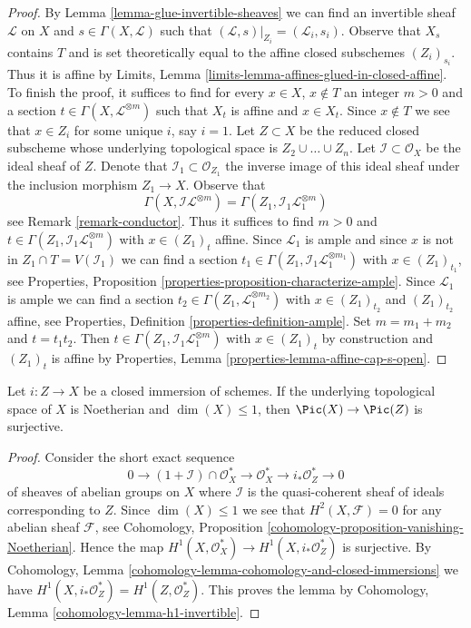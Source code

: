 \begin{proof}
\medskip\noindent
By Lemma \ref{lemma-glue-invertible-sheaves} we can find an invertible sheaf
$\mathcal{L}$ on $X$ and $s \in \Gamma(X, \mathcal{L})$
such that $(\mathcal{L}, s)|_{Z_i} = (\mathcal{L}_i, s_i)$.
Observe that $X_s$ contains $T$ and is set theoretically equal
to the affine closed subschemes $(Z_i)_{s_i}$. Thus it is affine by
Limits, Lemma \ref{limits-lemma-affines-glued-in-closed-affine}.
To finish the proof, it suffices to find for every $x \in X$, $x \not \in T$
an integer $m > 0$ and a section $t \in \Gamma(X, \mathcal{L}^{\otimes m})$
such that $X_t$ is affine and $x \in X_t$. Since $x \not \in T$
we see that $x \in Z_i$ for some unique $i$, say $i = 1$.
Let $Z \subset X$ be the reduced closed subscheme whose underlying
topological space is $Z_2 \cup \ldots \cup Z_n$.
Let $\mathcal{I} \subset \mathcal{O}_X$ be the ideal
sheaf of $Z$. Denote that $\mathcal{I}_1 \subset \mathcal{O}_{Z_1}$
the inverse image of this ideal sheaf under the inclusion
morphism $Z_1 \to X$. Observe that
$$
\Gamma(X, \mathcal{I}\mathcal{L}^{\otimes m}) =
\Gamma(Z_1, \mathcal{I}_1 \mathcal{L}_1^{\otimes m})
$$
see Remark \ref{remark-conductor}. Thus it suffices to find $m > 0$
and $t \in \Gamma(Z_1, \mathcal{I}_1 \mathcal{L}_1^{\otimes m})$
with $x \in (Z_1)_t$ affine. Since $\mathcal{L}_1$ is ample
and since $x$ is not in $Z_1 \cap T = V(\mathcal{I}_1)$
we can find a section
$t_1 \in \Gamma(Z_1, \mathcal{I}_1 \mathcal{L}_1^{\otimes m_1})$
with $x \in (Z_1)_{t_1}$, see Properties, Proposition
\ref{properties-proposition-characterize-ample}.
Since $\mathcal{L}_1$ is ample we can find a section
$t_2 \in \Gamma(Z_1, \mathcal{L}_1^{\otimes m_2})$
with $x \in (Z_1)_{t_2}$ and $(Z_1)_{t_2}$ affine, see
Properties, Definition \ref{properties-definition-ample}.
Set $m = m_1 + m_2$ and $t = t_1 t_2$. Then
$t \in \Gamma(Z_1, \mathcal{I}_1 \mathcal{L}_1^{\otimes m})$
with $x \in (Z_1)_t$ by construction and
$(Z_1)_t$ is affine by Properties, Lemma
\ref{properties-lemma-affine-cap-s-open}.
\end{proof}

\begin{lemma}
\label{lemma-lift-line-bundle-from-reduction-dimension-1}
Let $i : Z \to X$ be a closed immersion of schemes.
If the underlying topological space of $X$ is Noetherian and
$\dim(X) \leq 1$, then $\Pic(X) \to \Pic(Z)$ is surjective.
\end{lemma}

\begin{proof}
Consider the short exact sequence
$$
0 \to (1 + \mathcal{I}) \cap \mathcal{O}_X^* \to
\mathcal{O}^*_X \to i_*\mathcal{O}^*_Z \to 0
$$
of sheaves of abelian groups on $X$ where $\mathcal{I}$
is the quasi-coherent sheaf of ideals corresponding to $Z$.
Since $\dim(X) \leq 1$ we see that $H^2(X, \mathcal{F}) = 0$
for any abelian sheaf $\mathcal{F}$, see
Cohomology, Proposition \ref{cohomology-proposition-vanishing-Noetherian}.
Hence the map $H^1(X, \mathcal{O}^*_X) \to H^1(X, i_*\mathcal{O}_Z^*)$
is surjective. By
Cohomology, Lemma \ref{cohomology-lemma-cohomology-and-closed-immersions}
we have $H^1(X, i_*\mathcal{O}_Z^*) = H^1(Z, \mathcal{O}_Z^*)$.
This proves the lemma by
Cohomology, Lemma \ref{cohomology-lemma-h1-invertible}.
\end{proof}

